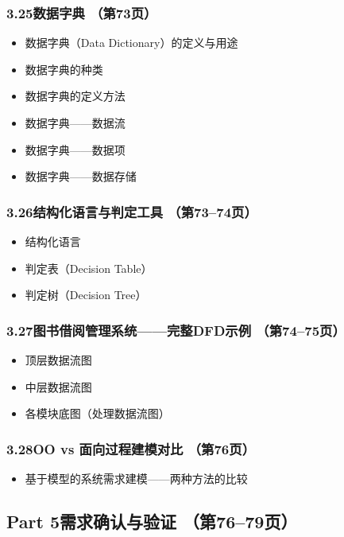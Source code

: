 \documentclass[12pt,a4paper]{ctexart}
\begin{document}
\subsubsection{3.25\quad 数据字典 \hfill（第73页）}
\begin{itemize}
    \item 数据字典（Data Dictionary）的定义与用途
    \item 数据字典的种类
    \item 数据字典的定义方法
    \item 数据字典——数据流
    \item 数据字典——数据项
    \item 数据字典——数据存储
\end{itemize}

\subsubsection{3.26\quad 结构化语言与判定工具 \hfill（第73--74页）}
\begin{itemize}
    \item 结构化语言
    \item 判定表（Decision Table）
    \item 判定树（Decision Tree）
\end{itemize}

\subsubsection{3.27\quad 图书借阅管理系统——完整DFD示例 \hfill（第74--75页）}
\begin{itemize}
    \item 顶层数据流图
    \item 中层数据流图
    \item 各模块底图（处理数据流图）
\end{itemize}

\subsubsection{3.28\quad OO vs 面向过程建模对比 \hfill（第76页）}
\begin{itemize}
    \item 基于模型的系统需求建模——两种方法的比较
\end{itemize}

\subsection{Part 5\quad 需求确认与验证 \hfill（第76--79页）}
\end{document}
